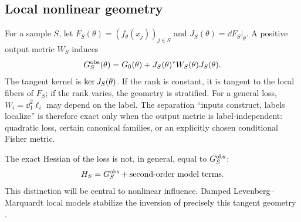 \subsection{Local nonlinear geometry}
For a sample $S$, let $F_S(\theta)=(f_\theta(x_j))_{j\in S}$ and $J_S(\theta)=\dd F_S|_\theta$. A positive output metric $W_S$ induces
\begin{equation}
G_S^{\rm obs}(\theta)=G_0(\theta)+J_S(\theta)^*W_S(\theta)J_S(\theta).
\end{equation}
The tangent kernel is $\operatorname{ker} J_S(\theta)$. If the rank is constant, it is tangent to the local fibers of $F_S$; if the rank varies, the geometry is stratified. For a general loss, $W_i=\dd_1^2\ell_i$ may depend on the label. The separation ``inputs construct, labels localize'' is therefore exact only when the output metric is label-independent: quadratic loss, certain canonical families, or an explicitly chosen conditional Fisher metric.

The exact Hessian of the loss is not, in general, equal to $G_S^{\rm obs}$:
\[
H_S=G_S^{\rm obs}+\text{second-order model terms}.
\]
This distinction will be central to nonlinear influence. Damped Levenberg--Marquardt local models stabilize the inversion of precisely this tangent geometry \citep{levenberg1944,marquardt1963,marquardt1970}.

